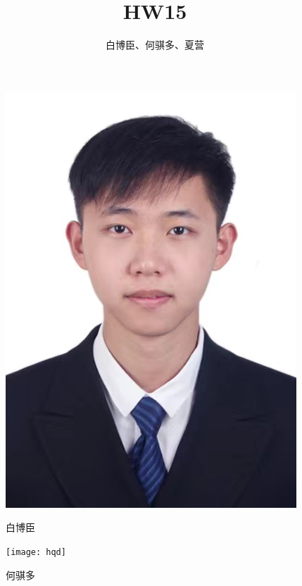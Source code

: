 \documentclass[UTF8]{ctexart}
\begin{document}
	\title{\textbf{HW15}}
	\author{白博臣、何骐多、夏营}
	\date{}
	\maketitle

    \begin{figure}[h]
        \centering
        \begin{minipage}{0.32\textwidth}
            \centering
            \includegraphics[width=\linewidth]{bbc}
            \caption{白博臣}
            \label{fig:img1}
        \end{minipage}\hfill
        \begin{minipage}{0.305\textwidth}
            \centering
            \texttt{[image: hqd]}
            \caption{何骐多}
            \label{fig:img2}
        \end{minipage}\hfill

\end{figure}
\end{document}
